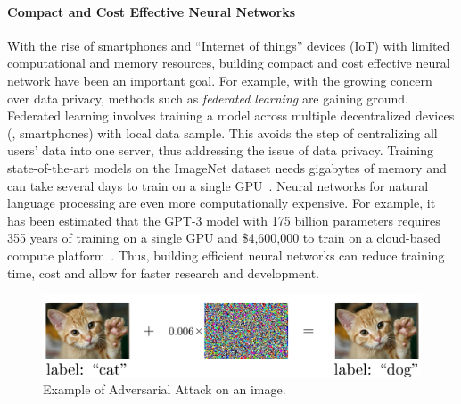 
\paragraph{Compact and Cost Effective Neural Networks}

With the rise of smartphones and ``Internet of things'' devices (IoT) with limited computational and memory resources, building compact and cost effective neural network have been an important goal.
For example, with the growing concern over data privacy, methods such as \emph{federated learning} are gaining ground.
Federated learning involves training a model across multiple decentralized devices (\eg, smartphones) with local data sample. 
This avoids the step of centralizing all users' data into one server, thus addressing the issue of data privacy.  
Training state-of-the-art models on the ImageNet dataset needs gigabytes of memory and can take several days to train on a single GPU~\cite{krizhevsky2012imagenet}. 
Neural networks for natural language processing are even more computationally expensive.
For example, it has been estimated that the GPT-3 model with 175 billion parameters requires 355 years of training on a single GPU and \$4,600,000 to train on a cloud-based compute platform~\cite{li2020overview}.
Thus, building efficient neural networks can reduce training time, cost and allow for faster research and development.


\begin{figure}[t]
  \centering
  \includegraphics[width=\textwidth]{figures/main/ch1-introduction/ExampleAdversarialCatDog.pdf}
  \caption{Example of Adversarial Attack on an image.}
  \label{figure:ch1-adversarial_image_example}
\end{figure}


